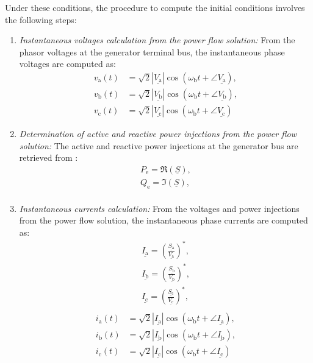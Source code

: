 Under these conditions, the procedure to compute the initial conditions involves the following steps:
\begin{enumerate}
\item \textit{Instantaneous voltages calculation from the power flow solution:} From the phasor voltages at the generator terminal bus,
the instantaneous phase voltages are computed as:
\begin{equation}
\begin{aligned}
v_\text{a}(t) &= \sqrt{2} |\underline{V_\text{a}}| \cos(\omega_\text{b} t + \angle \underline{V_\text{a}}), \\
v_\text{b}(t) &= \sqrt{2} |\underline{V_\text{b}}| \cos(\omega_\text{b} t + \angle \underline{V_\text{b}}), \\
v_\text{c}(t) &= \sqrt{2} |\underline{V_\text{c}}| \cos(\omega_\text{b} t + \angle \underline{V_\text{c}})
\end{aligned}
\end{equation}

\item \textit{Determination of active and reactive power injections from the power flow solution:} 
The active and reactive power injections at the generator bus are retrieved from :
\begin{equation}
\begin{aligned}
P_\text{e} = \Re(\underline{S}), \\
Q_\text{e} = \Im(\underline{S}), \\
\end{aligned}
\end{equation}

\item \textit{Instantaneous currents calculation:} From the voltages and power injections from the power flow solution, the instantaneous phase currents are computed as:
\begin{equation}
\begin{aligned}
    \underline{I_\text{a}} = \left( \frac{\underline{S_\text{a}}}{\underline{V_\text{a}}} \right)^*, \\
    \underline{I_\text{b}} = \left( \frac{\underline{S_\text{b}}}{\underline{V_\text{b}}} \right)^*, \\
    \underline{I_\text{c}} = \left( \frac{\underline{S_\text{c}}}{\underline{V_\text{c}}} \right)^*, \\
\end{aligned}
\end{equation}
\begin{equation}
\begin{aligned}
i_\text{a}(t) &= \sqrt{2} |\underline{I_\text{a}}| \cos(\omega_\text{b} t + \angle \underline{I_\text{a}}), \\
i_\text{b}(t) &= \sqrt{2} |\underline{I_\text{b}}| \cos(\omega_\text{b} t + \angle \underline{I_\text{b}}), \\
i_\text{c}(t) &= \sqrt{2} |\underline{I_\text{c}}| \cos(\omega_\text{b} t + \angle \underline{I_\text{c}})
\end{aligned}
\end{equation}


\end{enumerate}
